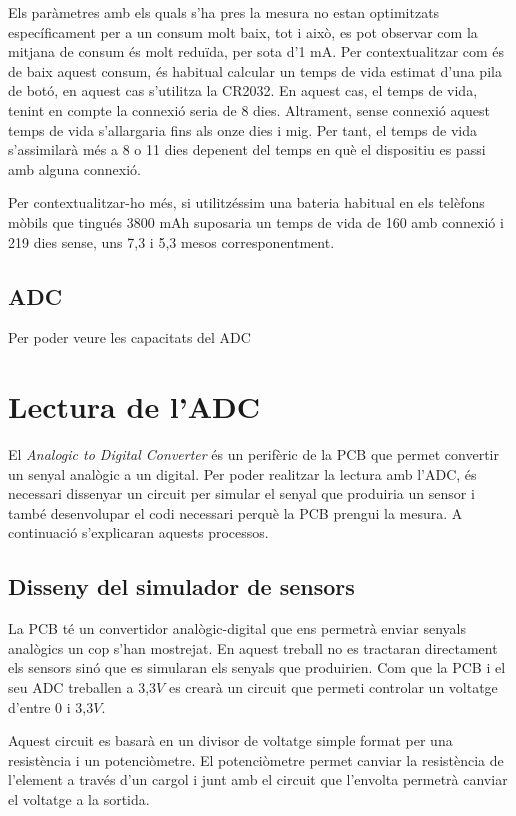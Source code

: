 Els paràmetres amb els quals s'ha pres la mesura no estan optimitzats específicament per a un consum molt baix, tot i això, es pot observar com la mitjana de consum és molt reduïda, per sota d'1 mA.
Per contextualitzar com és de baix aquest consum, és habitual calcular un temps de vida estimat d'una pila de botó, en aquest cas s'utilitza la CR2032.
En aquest cas, el temps de vida, tenint en compte la connexió seria de 8 dies.
Altrament, sense connexió aquest temps de vida s'allargaria fins als onze dies i mig.
Per tant, el temps de vida s'assimilarà més a 8 o 11 dies depenent del temps en què el dispositiu es passi amb alguna connexió.

Per contextualitzar-ho més, si utilitzéssim una bateria habitual en els telèfons mòbils que tingués 3800 mAh suposaria un temps de vida de 160 amb connexió i 219 dies sense, uns 7,3 i 5,3 mesos corresponentment.


\subsection{ADC}
Per poder veure les capacitats del ADC 

\section{Lectura de l'ADC}
El \textit{Analogic to Digital Converter} és un perifèric de la PCB que permet convertir un senyal analògic a un digital.
Per poder realitzar la lectura amb l'ADC, és necessari dissenyar un circuit per simular el senyal que produiria un sensor i també desenvolupar el codi necessari perquè la PCB prengui la mesura.
A continuació s'explicaran aquests processos.

\subsection{Disseny del simulador de sensors}
La PCB té un convertidor analògic-digital que ens permetrà enviar senyals analògics un cop s'han mostrejat.
En aquest treball no es tractaran directament els sensors sinó que es simularan els senyals que produirien.
Com que la PCB i el seu ADC treballen a 3,3$V$ es crearà un circuit que permeti controlar un voltatge d'entre 0 i 3,3$V$.

Aquest circuit es basarà en un divisor de voltatge simple format per una resistència i un potenciòmetre.
El potenciòmetre permet canviar la resistència de l'element a través d'un cargol i junt amb el circuit que l'envolta permetrà canviar el voltatge a la sortida.

